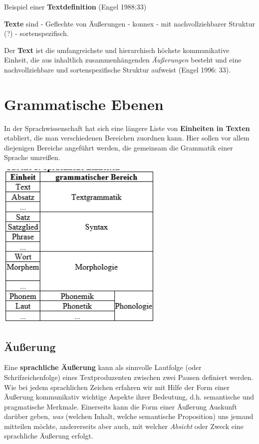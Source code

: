 \documentclass[
  letterpaper,
  DIV=11,
  numbers=noendperiod]{scrreprt}
\begin{document}
Beispiel einer \textbf{Textdefinition} (Engel 1988:33)

\textbf{Texte} sind - Geflechte von Äußerungen - konnex - mit
nachvollziehbarer Struktur (?) - sortenspezifisch.

Der \textbf{Text} ist die umfangreichste und hierarchisch höchste
kommunikative Einheit, die aus inhaltlich zusammenhängenden
\emph{Äußerungen} besteht und eine nachvollziehbare und
sortenspezifische Struktur aufweist (Engel 1996: 33).

\hypertarget{grammatische-ebenen}{%
\section{Grammatische Ebenen}\label{grammatische-ebenen}}

In der Sprachwissenschaft hat sich eine längere Liste von
\textbf{Einheiten in Texten} etabliert, die man verschiedenen Bereichen
zuordnen kann. Hier sollen vor allem diejenigen Bereiche angeführt
werden, die gemeinsam die Grammatik einer Sprache umreißen.

\includegraphics[width=0.6\textwidth,height=\textheight]{./pictures/grammatische_bereiche.png}

\hypertarget{uxe4uuxdferung}{%
\subsection{Äußerung}\label{uxe4uuxdferung}}

Eine \textbf{sprachliche Äußerung} kann als sinnvolle Lautfolge (oder
Schrifzeichenfolge) eines Textproduzenten zwischen zwei Pausen definiert
werden. Wie bei jedem sprachlichen Zeichen erfahren wir mit Hilfe der
Form einer Äußerung kommunikativ wichtige Aspekte ihrer Bedeutung, d.h.
semantische und pragmatische Merkmale. Einerseits kann die Form einer
Äußerung Auskunft darüber geben, \emph{was} (welchen Inhalt, welche
semantische Proposition) uns jemand mitteilen möchte, andererseits aber
auch, mit welcher \emph{Absicht} oder Zweck eine sprachliche Äußerung
erfolgt.
\end{document}
